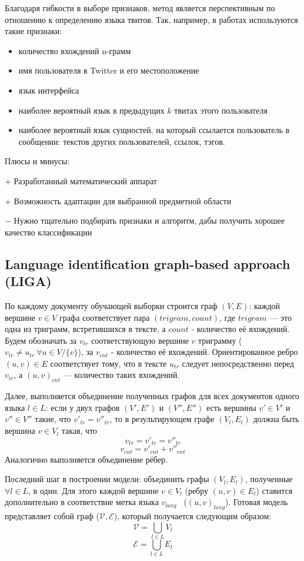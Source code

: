\documentclass[a4paper, 14pt]{article}
\begin{document}
		Благодаря гибкости в выборе признаков, метод является перспективным по отношению к определению языка твитов. Так, например, в работах \cite{ppm} \cite{lrev}
		используются такие признаки: 
		\begin{itemize}
			\item количество вхождений n-грамм
			\item имя пользователя в Twitter и его местоположение
			\item язык интерфейса
			\item наиболее вероятный язык в предыдущих $k$ твитах этого пользователя
			\item наиболее вероятный язык сущностей, на который ссылается пользователь в сообщении: текстов
		других пользователей, ссылок, тэгов.
		\end{itemize}		
		
		\noindent Плюсы и минусы:
		
		$+$ Разработанный математический аппарат
		
		$+$ Возможность адаптации для выбранной предметной области
		
		$-$ Нужно тщательно подбирать признаки и алгоритм, дабы получить хорошее качество классификации
		
		\subsection{Language identification graph-based approach (LIGA)}
		По каждому документу обучающей выборки строится граф $(V, E)$:
		 каждой вершине $v \in V$ графа соответствует пара $(trigram, count)$, где $trigram$ --- это одна
		из триграмм, встретившихся в тексте, а $count$ - количество её вхождений. Будем обозначать за $v_{tr}$ соответствующую вершине $v$ триграмму
		($v_{tr} \neq u_{tr} \ \forall u \in V/ \{v\}$), за $v_{cnt}$ - количество её вхождений. 
		Ориентированное ребро $(u, v) \in E$ соответствует тому, что в тексте $u_{tr}$ следует непосредственно
		перед $v_{tr}$, а $(u, v)_{cnt}$ --- количество таких вхождений.
		
		Далее, выполняется объединение полученных графов для всех документов одного языка $l \in L$: если у двух графов $(V', E')$ и $(V'', E'')$ есть вершины
		$v' \in V'$ и $v'' \in V''$ такие, что $v'_{tr} = v''_{tr}$, то в результирующем графе $(V_{l}, E_{l})$ должна быть вершина 
		$v \in V_{l}$ такая, что 
		$$v_{tr} = v'_{tr} = v''_{tr}$$ $$v_{cnt} = v'_{cnt} + v''_{cnt}$$
		Аналогично выполняется объединение рёбер.
		
		Последний шаг в построении модели: объединить графы $(V_{l}, E_{l})$, полученные $\forall l \in L$, в один. 
		Для этого каждой вершине $v \in V_{l}$
		(ребру $(u, v) \in E_{l}$) ставится дополнительно в соответствие метка языка $v_{lang}$ \ ($(u, v)_{lang}$). 
		Готовая модель представляет собой граф
		($\mathcal{V}, \mathcal{E}$), который получается следующим образом:
		$$ \mathcal{V} = \bigcup_{l \in L} V_{l}$$
		$$ \mathcal{E} = \bigcup_{l \in L} E_{l}$$
		
\end{document}
